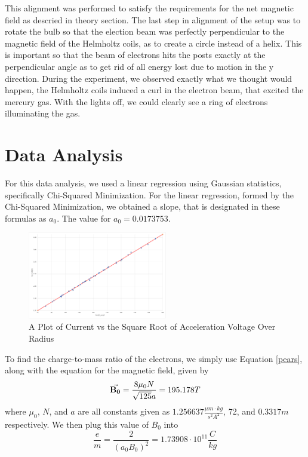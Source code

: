 \documentclass[aps,prl,10pt,twocolumn,floatfix]{revtex4-2}
\begin{document}
This alignment was performed to satisfy the requirements for the net magnetic field as descried in theory section.
The last step in alignment of the setup was to rotate the bulb so that the election beam was perfectly perpendicular to the magnetic field of the Helmholtz coils, as to create a circle instead of a helix.
This is important so that the beam of electrons hits the posts exactly at the perpendicular angle as to get rid of all energy lost due to motion in the y direction.
During the experiment, we observed exactly what we thought would happen, the Helmholtz coils induced a curl in the electron beam, that excited the mercury gas.
With the lights off, we could clearly see a ring of electrons illuminating the gas.


\section{Data Analysis}
For this data analysis, we used a linear regression using Gaussian statistics, specifically Chi-Squared Minimization.
For the linear regression, formed by the Chi-Squared Minimization, we obtained a slope, that is designated in these formulas as $a_0$.
The value for $a_0=0.0173753$.

\begin{figure}
    \includegraphics[width=230px]{data_plot.png}
    \caption{A Plot of Current vs the Square Root of Acceleration Voltage Over Radius}
\end{figure}

To find the charge-to-mass ratio of the electrons, we simply use Equation \ref{pears}, along with the equation for the magnetic field, given by
\begin{equation}
	\va{B_0}=\frac{8\mu_0N}{\sqrt{125}a}=195.178 T
\end{equation}
where $\mu_0$, $N$, and $a$ are all constants given as $1.256637\frac{\mu m\cdot kg}{s^2A^2}$, 72, and $0.3317m$ respectively.
We then plug this value of $B_0$ into
\begin{equation}
	\frac{e}{m}=\frac{2}{(a_0B_0)^2}=1.73908\cdot10^{11}\frac{C}{kg}
\end{equation}
\end{document}
